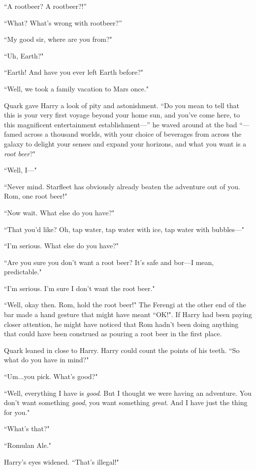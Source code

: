 \documentclass[twoside,letterpaper,12pt]{memoir}
\begin{document}
``A rootbeer? A rootbeer?!''

``What? What's wrong with rootbeer?''

``My good sir, where are you from?"

``Uh, Earth?"

``Earth! And have you ever left Earth before?"

``Well, we took a family vacation to Mars once."

Quark gave Harry a look of pity and astonishment. ``Do you mean to tell that this is your very first voyage beyond your home sun, and you've come here, to this magnificent entertainment establishment---'' he waved around at the bad ``---famed across a thousand worlds, with your choice of beverages from across the galaxy to delight your senses and expand your horizons, and what you want is a \textit{root beer}?"

``Well, I---"

``Never mind. Starfleet has obviously already beaten the adventure out of you. Rom, one root beer!"

``Now wait. What else do you have?"

``That you'd like? Oh, tap water, tap water with ice, tap water with bubbles---"

``I'm serious. What else do you have?"

``Are you sure you don't want a root beer? It's safe and bor---I mean, predictable."

``I'm serious. I'm sure I don't want the root beer."

``Well, okay then. Rom, hold the root beer!" The Ferengi at the other end of the bar made a hand gesture that might have meant ``OK!". If Harry had been paying closer attention, he might have noticed that Rom hadn't been doing anything that could have been construed as pouring a root beer in the first place.

Quark leaned in close to Harry. Harry could count the points of his teeth. ``So what do you have in mind?"

``Um...you pick. What's good?"

``Well, everything I have is \textit{good}. But I thought we were having an adventure. You don't want something \textit{good}, you want something \textit{great}. And I have just the thing for you."

``What's that?"

``Romulan Ale."

Harry's eyes widened. ``That's illegal!"
\end{document}

